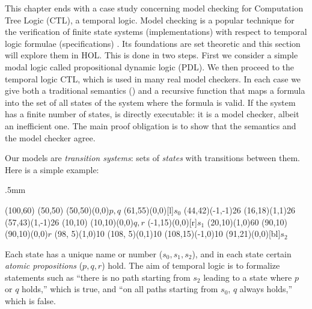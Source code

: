 %
\begin{isabellebody}%
\def\isabellecontext{Base}%
%
\isadelimtheory
%
\endisadelimtheory
%
\isatagtheory
%
\endisatagtheory
{\isafoldtheory}%
%
\isadelimtheory
%
\endisadelimtheory
%
\isamarkuptrue%
%
\begin{isamarkuptext}%
\label{sec:VMC}
This chapter ends with a case study concerning model checking for 
Computation Tree Logic (CTL), a temporal logic.
Model checking is a popular technique for the verification of finite
state systems (implementations) with respect to temporal logic formulae
(specifications) \cite{ClarkeGP-book,Huth-Ryan-book}. Its foundations are set theoretic
and this section will explore them in HOL\@. This is done in two steps.  First
we consider a simple modal logic called propositional dynamic
logic (PDL)\@.  We then proceed to the temporal logic CTL, which is
used in many real
model checkers. In each case we give both a traditional semantics () and a
recursive function  that maps a formula into the set of all states of
the system where the formula is valid. If the system has a finite number of
states,  is directly executable: it is a model checker, albeit an
inefficient one. The main proof obligation is to show that the semantics
and the model checker agree.

\underscoreon

Our models are \emph{transition systems}:
sets of \emph{states} with
transitions between them.  Here is a simple example:
\begin{center}
\unitlength.5mm
\thicklines
\begin{picture}(100,60)
\put(50,50){}
\put(50,50){\makebox(0,0){$p,q$}}
\put(61,55){\makebox(0,0)[l]{$s_0$}}
\put(44,42){\vector(-1,-1){26}}
\put(16,18){\vector(1,1){26}}
\put(57,43){\vector(1,-1){26}}
\put(10,10){}
\put(10,10){\makebox(0,0){$q,r$}}
\put(-1,15){\makebox(0,0)[r]{$s_1$}}
\put(20,10){\vector(1,0){60}}
\put(90,10){}
\put(90,10){\makebox(0,0){$r$}}
\put(98, 5){\line(1,0){10}}
\put(108, 5){\line(0,1){10}}
\put(108,15){\vector(-1,0){10}}
\put(91,21){\makebox(0,0)[bl]{$s_2$}}
\end{picture}
\end{center}
Each state has a unique name or number ($s_0,s_1,s_2$), and in each state
certain \emph{atomic propositions} ($p,q,r$) hold.  The aim of temporal logic
is to formalize statements such as ``there is no path starting from $s_2$
leading to a state where $p$ or $q$ holds,'' which is true, and ``on all paths
starting from $s_0$, $q$ always holds,'' which is false.


\end{isamarkuptext}
\end{isabellebody}
